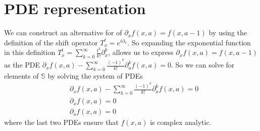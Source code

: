 \documentclass[%
 onecolumn,
 amsmath, amssymb, aps, pra, 10pt
]{revtex4-2}
\begin{document}
\section*{PDE representation}
We can construct an alternative for of $\partial_x f(x, a) = f(x, a - 1)$ by using the definition of the shift operator $T_{x}^{t} = e^{t \partial_x}$. So expanding the exponential function in this definition $T_{x}^t = \sum_{k=0}^{\infty} \frac{t^k}{k!} \partial_{x}^{k}$, allows us to express $\partial_x f(x, a) = f(x, a - 1)$ as the PDE $\partial_x f(x, a) - \sum_{k=0}^{\infty} \frac{(-1)^k}{k!}\partial_{a}^{k} f(x, a) = 0$. So we can solve for elements of $\mathbb{S}$ by solving the system of PDEs
\begin{align*}
&\partial_x f(x, a) - \sum_{k=0}^{\infty} \frac{(-1)^k}{k!} \partial_{a}^{k} f(x, a) = 0 \\
&\partial_{\bar{x}} f(x, a) = 0 \\
&\partial_{\bar{a}} f(x, a) = 0
\end{align*}
where the last two PDEs ensure that $f(x, a)$ is complex analytic.
\end{document}
